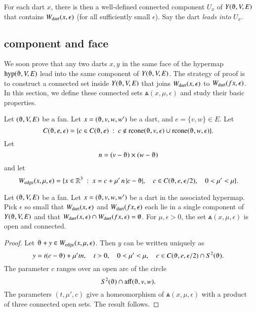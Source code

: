 \begin{definition} For each dart $x$, 
there is then a well-defined connected
component $U_x$ of $Y(\orgn,V,E)$ 
that contains $W_{\text{dart}}(x,\epsilon)$ (for all
sufficiently small $\epsilon$). Say the dart {\it leads into}
$U_x$.
\end{definition}


\subsection{component and face}


We soon prove that any two darts $x,y$  in the same
face of the hypermap $\op{hyp}(\orgn,V,E)$ lead
into the same component of $Y(\orgn,V,E)$.  The
strategy of  proof
is to construct a connected set inside $Y(\orgn,V,E)$
that joins $W_{\text{dart}}(x,\epsilon)$ to $W_{\text{dart}}(f x,\epsilon)$.  
In this section, we define these connected sets $\Wedge(x,\mu,\epsilon)$
and study their basic properties.

Let $(\orgn,V,E)$ be a fan.   Let
$x=(\orgn,v,w,w')$ be a dart, and  $e = \{v,w\}\in E$.
Let 
  $$C(\orgn,e,\epsilon) =
    \{ c\in C(\orgn,e) \mid c\not\in \op{rcone}(\orgn,v,\epsilon)
    \cup\op{rcone}(\orgn,w,\epsilon)\}.
  $$
Let 
  $$n = (v-\orgn)\times (w-\orgn)$$
and let
  $$
  \Wedge(x,\mu,\epsilon) = \{ x  \in \ring{R}^3 \mid
     x = c + \mu'\, n\, |c-\orgn|,\quad
     c\in C(\orgn,e,\epsilon/2),\quad
     0 < \mu' < \mu
     \}.
  $$

\begin{lemma}  
Let $(\orgn,V,E)$ be a fan.
Let $x=(\orgn,v,w,w')$ be a dart in the associated hypermap.
Pick $\epsilon$ so small that $W_{\text{dart}}(x,\epsilon)$
and $W_{\text{dart}}(f x,\epsilon)$ each lie in a single component 
of $Y(\orgn,V,E)$ and
that $W_{\text{dart}}(x,\epsilon)\cap W_{\text{dart}}(f x,\epsilon) =\emptyset$.
For $\mu,\epsilon > 0$, the set $\Wedge(x,\mu,\epsilon)$ is
open and connected.
\end{lemma}

\begin{proof}  Let $\orgn + y \in \Wedge(x,\mu,\epsilon)$.
Then $y$ can be written uniquely as
$$
  y = t (c - \orgn) + \mu' t n,\quad
  t > 0,\quad
  0 < \mu' < \mu,\quad
  c \in C(\orgn,e,\epsilon/2) \cap S^2(\orgn).
$$
The parameter $c$ ranges over an open arc of the circle
$$S^2(\orgn) \cap \op{aff}(\orgn,v,w).$$
The parameters $(t,\mu',c)$ give a homeomorphism of $\Wedge(x,\mu,\epsilon)$
with a product of three connected open sets.  The result follows.
\end{proof}


